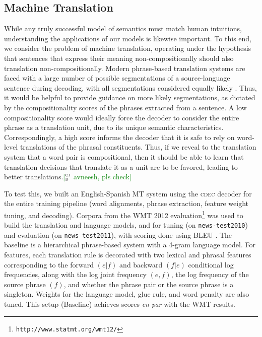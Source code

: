 \documentclass[11pt,letterpaper]{article}
\newcommand{\ensuretext}[1]{#1}
\newcommand{\clabcomment}[3]{\ensuretext{\textcolor{#3}{[#1 #2]}}}
\newcommand{\cjdmarker}{\ensuretext{\textcolor{green}{\ensuremath{^{\textsc{cj}}_{\textsc{d}}}}}}
\newcommand{\cjd}[1]{\clabcomment{\cjdmarker}{#1}{green}}
\begin{document}
\subsection{Machine Translation}
\label{sec:mt-eval}

While any truly successful model of semantics must match human intuitions, understanding the applications of our models is likewise important. To this end, we consider the problem of machine translation, operating under the hypothesis that sentences that express their meaning non-compositionally should also translation non-compositionally. Modern phrase-based translation systems are faced with a large number of possible segmentations of a source-language sentence during decoding, with all segmentations considered equally likely \cite{Koehn2003}.  
Thus, it would be helpful to provide guidance on more likely segmentations, as dictated by the compositionality scores of the phrases extracted from a sentence. 
A low compositionality score would ideally force the decoder to consider the entire phrase as a translation unit, due to its unique semantic characteristics.
Correspondingly, a high score informs the decoder that it is safe to rely on word-level translations of the phrasal constituents. Thus, if we reveal to the translation system that a word pair is compositional, then it should be able to learn that translation decisions that translate it as a unit are to be favored, leading to better translations.\cjd{avneesh, pls check}




To test this, we built an English-Spanish MT system using the \textsc{cdec} decoder \cite{Dyer2010} for the entire training pipeline (word alignments, phrase extraction, feature weight tuning, and decoding).
Corpora from the WMT 2012 evaluation\footnote{\texttt{http://www.statmt.org/wmt12/}} was used to build the translation and language models, and for tuning (on \texttt{news-test2010}) and evaluation (on \texttt{news-test2011}), with scoring done using BLEU \cite{Papineni2002}. 
The baseline is a hierarchical phrase-based system \cite{Chiang2007} with a 4-gram language model. 
For features, each translation rule is decorated with two lexical and phrasal features corresponding to the forward $(e|f)$ and backward $(f|e)$ conditional log frequencies, along with the log joint frequency $(e,f)$, the log frequency of the source phrase $(f)$, and whether the phrase pair or the source phrase is a singleton. 
Weights for the language model, glue rule, and word penalty are also tuned. 
This setup (Baseline) achieves scores \emph{en par} with the WMT results. 
\end{document}
